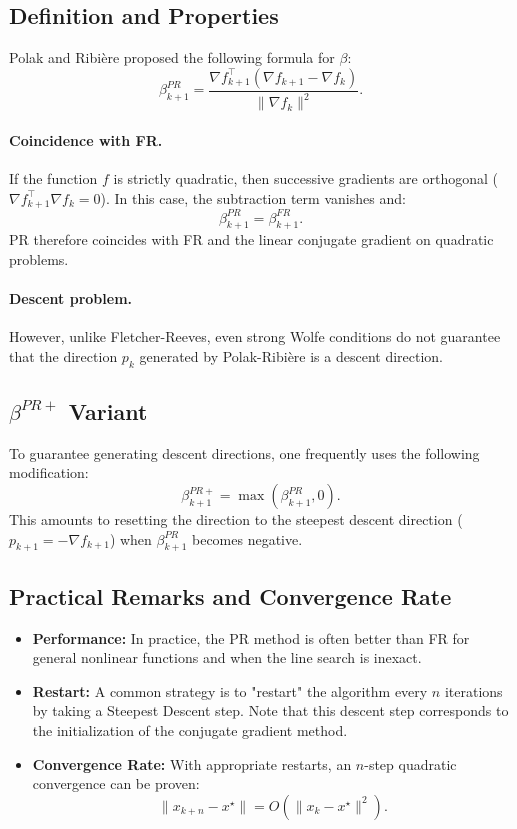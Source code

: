 \subsection{Definition and Properties}

Polak and Ribière proposed the following formula for $\beta$:
\[
\boxed{\beta_{k+1}^{PR} = \frac{\nabla f_{k+1}^\top (\nabla f_{k+1} - \nabla f_k)}{\|\nabla f_k\|^2}}.
\]

\paragraph{Coincidence with FR.}
If the function $f$ is strictly quadratic, then successive gradients are orthogonal ($\nabla f_{k+1}^\top \nabla f_k = 0$). In this case, the subtraction term vanishes and:
\[
\beta_{k+1}^{PR} = \beta_{k+1}^{FR}.
\]
PR therefore coincides with FR and the linear conjugate gradient on quadratic problems.

\paragraph{Descent problem.}
However, unlike Fletcher-Reeves, even strong Wolfe conditions do not guarantee that the direction $p_k$ generated by Polak-Ribière is a descent direction.

\subsection{\texorpdfstring{$\beta^{PR+}$}{beta\_PR+} Variant}

To guarantee generating descent directions, one frequently uses the following modification:
\[
\beta_{k+1}^{PR+} = \max\left( \beta_{k+1}^{PR}, 0 \right).
\]
This amounts to resetting the direction to the steepest descent direction ($p_{k+1} = -\nabla f_{k+1}$) when $\beta_{k+1}^{PR}$ becomes negative.

\subsection{Practical Remarks and Convergence Rate}

\begin{itemize}
    \item \textbf{Performance:} In practice, the PR method is often better than FR for general nonlinear functions and when the line search is inexact.
    \item \textbf{Restart:} A common strategy is to "restart" the algorithm every $n$ iterations by taking a Steepest Descent step. Note that this descent step corresponds to the initialization of the conjugate gradient method.
    \item \textbf{Convergence Rate:} With appropriate restarts, an $n$-step quadratic convergence can be proven:
    \[
    \|x_{k+n} - x^\star\| = O\left( \|x_k - x^\star\|^2 \right).
    \]
\end{itemize}

